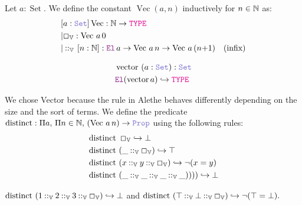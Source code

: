 \begin{definition}
Let \( a : \mathop{\mathrm{Set}} \). We define the constant \( \mathop{\mathrm{Vec}}(a, n) \) inductively for \( n \in \mathbb{N} \) as:
\begin{align*}
&[a: \set] \mathop{\mathrm{Vec}}: \N \ra \type \\
&|\Box_\bb{V} : \mathop{\mathrm{Vec}}\,a\, 0 \\
&|\mathbin{::}_\bb{V}\,[n:\N]: \el\,a \ra \mathop{\mathrm{Vec}}\,a\,n \ra  \mathop{\mathrm{Vec}}\,a\,(n{+}1) \quad (\text{infix}) \\
\end{align*}

\begin{align*}
&\mathop{\mathrm{vector}}~(a: \set): \set \\
&\el (\mathop{\mathrm{vector}} a) \re \type
\end{align*}

We chose Vector because the  rule in Alethe \cite[(Rule 93)]{alethespec} behaves differently depending on the size and the sort of terms.
We define the predicate \( \mathop{\mathrm{distinct}}: \Pi a,\, \Pi n \in \N,\, (\mathop{\mathrm{Vec}}\,a\,n) \ra \prop \) using the following rules:
\begin{align*}
&\mathop{\mathrm{distinct}}~\Box_\mathbb{V} \hookrightarrow \bot \\
&\mathop{\mathrm{distinct}}~(\_ \mathbin{::}_\mathbb{V} \Box_\mathbb{V}) \hookrightarrow \top \\
&\mathop{\mathrm{distinct}}~(x \mathbin{::}_\mathbb{V} y \mathbin{::}_\mathbb{V}  \Box_\mathbb{V}) \hookrightarrow \neg (x = y) \\
&\mathop{\mathrm{distinct}}~(\_ \mathbin{::}_\mathbb{V} \_ \mathbin{::}_\mathbb{V} \_ \mathbin{::}_\mathbb{V} \_)))) \hookrightarrow \bot
\end{align*}
\end{definition}

\begin{example}
\(
    \mathop{\mathrm{distinct}}~(1 \mathbin{::}_\mathbb{V} 2 \mathbin{::}_\mathbb{V} 3 \mathbin{::}_\mathbb{V} \Box_\mathbb{V}) \hookrightarrow \bot
\)
and
\(
    \mathop{\mathrm{distinct}}~(\top \mathbin{::}_\mathbb{V} \bot \mathbin{::}_\mathbb{V} \Box_\mathbb{V}) \hookrightarrow \neg (\top = \bot).
\)
\end{example}

